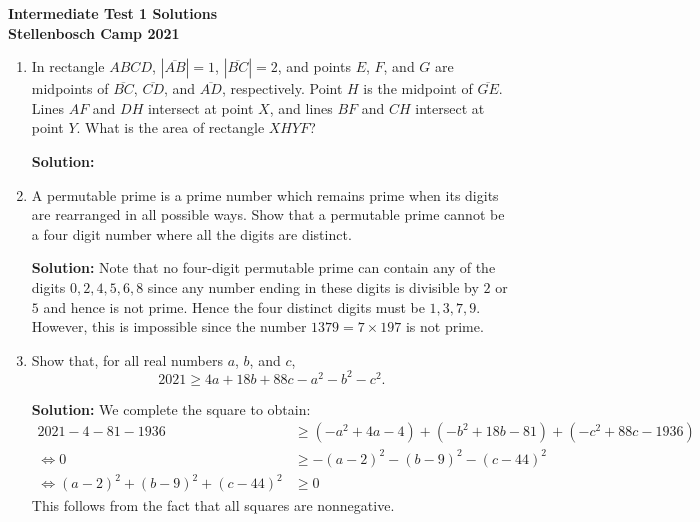 \documentclass{article}
\begin{document}
\thispagestyle{empty}

\begin{center}
  \textbf{\Large Intermediate Test 1 Solutions}
  \\ \vspace{1em}
  \textbf{\large Stellenbosch Camp 2021}
  \\ \vspace{1em}
\end{center}

\vspace{24pt}

\begin{enumerate}[1.]

\item %
In rectangle $ABCD$, $|\overline{AB}|=1$, $|\overline{BC}|=2$, and points $E$, $F$, and $G$ are midpoints of $\overline{BC}$, $\overline{CD}$, and $\overline{AD}$, respectively.
Point $H$ is the midpoint of $\overline{GE}$.
Lines $AF$ and $DH$ intersect at point $X$, and lines $BF$ and $CH$ intersect at point $Y$.
What is the area of rectangle $XHYF$?

\textbf{Solution:} 

\item %
A permutable prime is a prime number which remains prime when its digits are rearranged in all possible ways. Show that a permutable prime cannot be a four digit number where all the digits are distinct.

\textbf{Solution:} Note that no four-digit permutable prime can contain any of the digits $0,2,4,5,6,8$ since any number ending in these digits is divisible by $2$ or $5$ and hence is not prime. Hence the four distinct digits must be $1,3,7,9$. However, this is impossible since the number $1379 = 7 \times 197$ is not prime. 

\item %
Show that, for all real numbers $a$, $b$, and $c$,
\[ 2021 \geq 4a + 18b + 88c - a^2 - b^2 - c^2. \]

\textbf{Solution:} We complete the square to obtain:  \begin{align*}
 2021-4-81-1936 &\geq (-a^2+4a- 4) + (-b^2+18b-81) + (-c^2+88c-1936) \\
							\iff	0 &\geq -(a-2)^2 -(b-9)^2 -(c-44)^2\\
							\iff	(a-2)^2 + (b-9)^2 + (c-44)^2 &\geq 0
\end{align*} 
This follows from the fact that all squares are nonnegative.



\end{enumerate}
\end{document}
